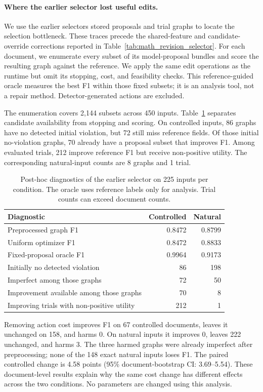 \paragraph{Where the earlier selector lost useful edits.}
We use the earlier selector\textquotesingle s stored proposals and trial graphs to locate the selection bottleneck. These traces precede the shared-feature and candidate-override corrections reported in Table~\ref{tab:math_revision_selector}. For each document, we enumerate every subset of its model-proposal bundles and score the resulting graph against the reference. We apply the same edit operations as the runtime but omit its stopping, cost, and feasibility checks. This reference-guided oracle measures the best F1 within those fixed subsets; it is an analysis tool, not a repair method. Detector-generated actions are excluded.

The enumeration covers 2,144 subsets across 450 inputs. Table~\ref{tab:selection_bottlenecks} separates candidate availability from stopping and scoring. On controlled inputs, 86 graphs have no detected initial violation, but 72 still miss reference fields. Of those initial no-violation graphs, 70 already have a proposal subset that improves F1. Among evaluated trials, 212 improve reference F1 but receive non-positive utility. The corresponding natural-input counts are 8 graphs and 1 trial.

\begin{table}[t]
\centering
\caption{Post-hoc diagnostics of the earlier selector on 225 inputs per condition. The oracle uses reference labels only for analysis. Trial counts can exceed document counts.}
\label{tab:selection_bottlenecks}
\small
\begin{tabular}{lrr}
\toprule
Diagnostic & Controlled & Natural \\
\midrule
Preprocessed graph F1 & 0.8472 & 0.8799 \\
Uniform optimizer F1 & 0.8472 & 0.8833 \\
Fixed-proposal oracle F1 & 0.9964 & 0.9173 \\
Initially no detected violation & 86 & 198 \\
Imperfect among those graphs & 72 & 50 \\
Improvement available among those graphs & 70 & 8 \\
Improving trials with non-positive utility & 212 & 1 \\
\bottomrule
\end{tabular}
\end{table}

Removing action cost improves F1 on 67 controlled documents, leaves it unchanged on 158, and harms 0. On natural inputs it improves 0, leaves 222 unchanged, and harms 3. The three harmed graphs were already imperfect after preprocessing; none of the 148 exact natural inputs loses F1. The paired controlled change is 4.58 points (95\% document-bootstrap CI: 3.69--5.54). These document-level results explain why the same cost change has different effects across the two conditions. No parameters are changed using this analysis.
